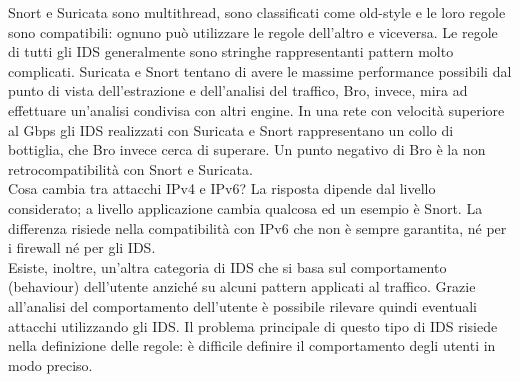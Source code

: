 Snort e Suricata sono multithread, sono classificati come old-style e le loro regole sono compatibili: ognuno può utilizzare le regole dell'altro e viceversa. Le regole di tutti gli IDS generalmente sono stringhe rappresentanti pattern molto complicati. Suricata e Snort tentano di avere le massime performance possibili dal punto di vista dell'estrazione e dell'analisi del traffico, Bro, invece, mira ad effettuare un'analisi condivisa con altri engine. In una rete con velocità superiore al Gbps gli IDS realizzati con Suricata e Snort rappresentano un collo di bottiglia, che Bro invece cerca di superare. Un punto negativo di Bro è la non retrocompatibilità con Snort e Suricata.\\
Cosa cambia tra attacchi IPv4 e IPv6? La risposta dipende dal livello considerato; a livello applicazione cambia qualcosa ed un esempio è Snort. La differenza risiede nella compatibilità con IPv6 che non è sempre garantita, né per i firewall né per gli IDS.\\
Esiste, inoltre, un'altra categoria di IDS che si basa sul comportamento (behaviour) dell'utente anziché su alcuni pattern applicati al traffico. Grazie all'analisi del comportamento dell'utente è possibile rilevare quindi eventuali attacchi utilizzando gli IDS. Il problema principale di questo tipo di IDS risiede nella definizione delle regole: è difficile definire il comportamento degli utenti in modo preciso.
